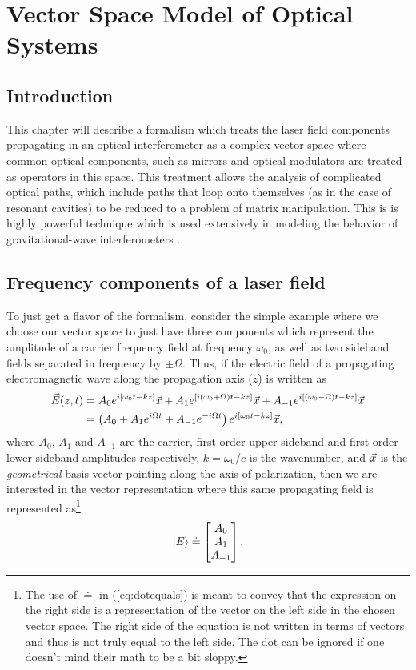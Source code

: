 

\chapter{Vector Space Model of Optical Systems}

\section{Introduction}
This chapter will describe a formalism which treats the laser field components propagating in an optical interferometer as a complex vector space where common optical components, such as mirrors and optical modulators are treated as operators in this space. %
This treatment allows the analysis of complicated optical paths, which include paths that loop onto themselves (as in the case of resonant cavities) to be reduced to a problem of matrix manipulation. %
This is is highly powerful technique which is used extensively in modeling the behavior of gravitational-wave interferometers \cite{Vinet1986,Hefetz:97,Sigg:00}.

\section{Frequency components of a laser field}
\label{sec:freqspace}
To just get a flavor of the formalism, consider the simple example where we choose our vector space to just have three components which represent the amplitude of a carrier frequency field at frequency $\omega_0$, as well as two sideband fields separated in frequency by $\pm\Omega$. %
Thus, if the electric field of a propagating electromagnetic wave along the propagation axis ($z$) is written as
\begin{align*}
\vec{E}(z,t) &= A_0 e^{i[\omega_0t -kz]}\vec{x} + A_1e^{[i(\omega_0+\Omega)t -kz]}\vec{x} + A_{-1}e^{i[(\omega_0-\Omega)t -kz]}\vec{x}\\
&= \left( A_0 + A_1 e^{i\Omega t}+A_{-1}e^{-i\Omega t}\right) e^{i[\omega_0 t-kz]}\vec{x},
\end{align*}
where $A_0$, $A_1$ and $A_{-1}$ are the carrier, first order upper sideband and first order lower sideband amplitudes respectively, $k=\omega_0/c$ is the wavenumber, and $\vec{x}$ is the \emph{geometrical} basis vector pointing along the axis of polarization, then we are interested in the vector representation where this same propagating field is represented as\footnote{The use of $\doteq$ in (\ref{eq:dotequals}) is meant to convey that the expression on the right side is a representation of the vector on the left side in the chosen vector space. %
The right side of the equation is not written in terms of vectors and thus is not truly equal to the left side. %
The dot can be ignored if one doesn't mind their math to be a bit sloppy.} 
\begin{equation}
\label{eq:dotequals}
\left| E \right> \doteq \left[\begin{matrix} A_0 \\ A_1 \\ A_{-1} \end{matrix}\right].
\end{equation}

